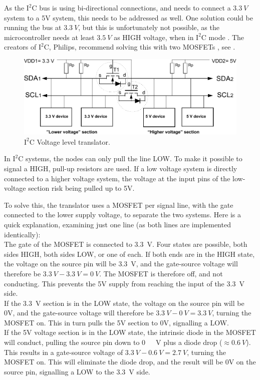 As the $\text{I}^2\text{C}$ bus is using bi-directional connections, and needs to connect a $\SI{3,3}{V}$ system to a 5V system, this needs to be addressed as well. One solution could be running the bus at $\SI{3,3}{V}$, but this is unfortunately not possible, as the microcontroller needs at least $\SI{3,5}{V}$ as HIGH voltage, when in  $\text{I}^2\text{C}$ mode \cite{Atmega}. The creators of $\text{I}^2\text{C}$, Philips, recommend solving this with two MOSFETs \cite{Philips}, see .

\begin{figure}[H]
	\centering
	\includegraphics[scale=0.9]{figures/i2cLevel.pdf}
	\caption{$\text{I}^2\text{C}$ Voltage level translator. \cite{Philips}}
	\label{i2clevel}
\end{figure}

In $\text{I}^2\text{C}$ systems, the nodes can only pull the line LOW. To make it possible to signal a HIGH, pull-up resistors are used. If a low voltage system is directly connected to a higher voltage system, the voltage at the input pins of the low-voltage section risk being pulled up to 5V.

To solve this, the translator uses a MOSFET per signal line, with the gate connected to the lower supply voltage, to separate the two systems. Here is a quick explanation, examining just one line (as both lines are implemented identically):\\
%
The gate of the MOSFET is connected to \SI{3,3}{V}.
Four states are possible, both sides HIGH, both sides LOW, or one of each.
If both ends are in the HIGH state, the voltage on the source pin will be \SI{3,3}{V}, and the gate-source voltage will therefore be $\SI{3,3}{V}-\SI{3,3}{V}=\SI{0}{V}$. The MOSFET is therefore off, and not conducting. This prevents the 5V supply from reaching the input of the \SI{3,3}{V} side.\\
If the \SI{3,3}{V} section is in the LOW state, the voltage on the source pin will be 0V, and the gate-source voltage will therefore be $\SI{3,3}{V}-\SI{0}{V}=\SI{3,3}{V}$, turning the MOSFET on. This in turn pulls the 5V section to 0V, signalling a LOW.\\
If the 5V voltage section is in the LOW state, the intrinsic diode in the MOSFET will conduct, pulling the source pin down to \si{0\ V} plus a diode drop ($\approx\SI{0,6}{V}$). This results in a gate-source voltage of $\SI{3,3}{V}-\SI{0,6}{V}=\SI{2,7}{V}$, turning the MOSFET on. This will eliminate the diode drop, and the result will be 0V on the source pin, signalling a LOW to the \SI{3,3}{V} side.


